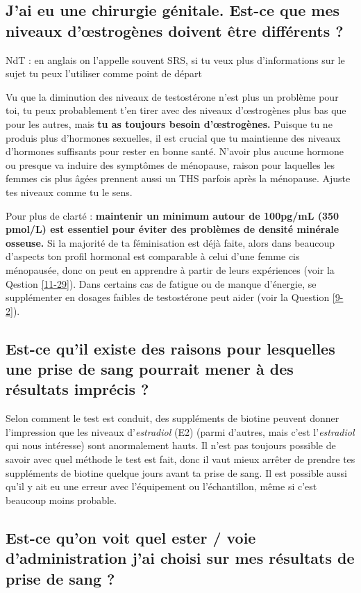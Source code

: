 \documentclass{article}
\begin{document}
\subsection{J'ai eu une chirurgie génitale. Est-ce que mes niveaux d'œstrogènes doivent être différents ?}

NdT : en anglais on l'appelle souvent SRS, si tu veux plus d'informations sur le sujet tu peux l'utiliser comme point de départ

Vu que la diminution des niveaux de testostérone n'est plus un problème pour toi, tu peux probablement t'en tirer avec des niveaux d'œstrogènes plus bas que pour les autres, mais \textbf{tu as toujours besoin d'œstrogènes.} Puisque tu ne produis plus d'hormones sexuelles, il est crucial que tu maintienne des niveaux d'hormones suffisants pour rester en bonne santé. N'avoir plus aucune hormone ou presque va induire des symptômes de ménopause, raison pour laquelles les femmes cis plus âgées prennent aussi un THS parfois après la ménopause. Ajuste tes niveaux comme tu le sens.

Pour plus de clarté : \textbf{maintenir un minimum autour de 100pg/mL (350 pmol/L) est essentiel pour éviter des problèmes de densité minérale osseuse.} Si la majorité de ta féminisation est déjà faite, alors dans beaucoup d'aspects ton profil hormonal est comparable à celui d'une femme cis ménopausée, donc on peut en apprendre à partir de leurs expériences (voir la Qestion \ref{11-29}). Dans certains cas de fatigue ou de manque d'énergie, se supplémenter en dosages faibles de testostérone peut aider (voir la Question \ref{9-2}). 

\subsection{Est-ce qu'il existe des raisons pour lesquelles une prise de sang pourrait mener à des résultats imprécis ?}

Selon comment le test est conduit, des suppléments de biotine peuvent donner l'impression que les niveaux d'\textit{estradiol} (E2) (parmi d'autres, mais c'est l'\textit{estradiol} qui nous intéresse) sont anormalement hauts. Il n'est pas toujours possible de savoir avec quel méthode le test est fait, donc il vaut mieux arrêter de prendre tes suppléments de biotine quelque jours avant ta prise de sang. Il est possible aussi qu'il y ait eu une erreur avec l'équipement ou l'échantillon, même si c'est beaucoup moins probable.

\subsection{Est-ce qu'on voit quel ester / voie d'administration j'ai choisi sur mes résultats de prise de sang ?}\label{4-16}
\end{document}
